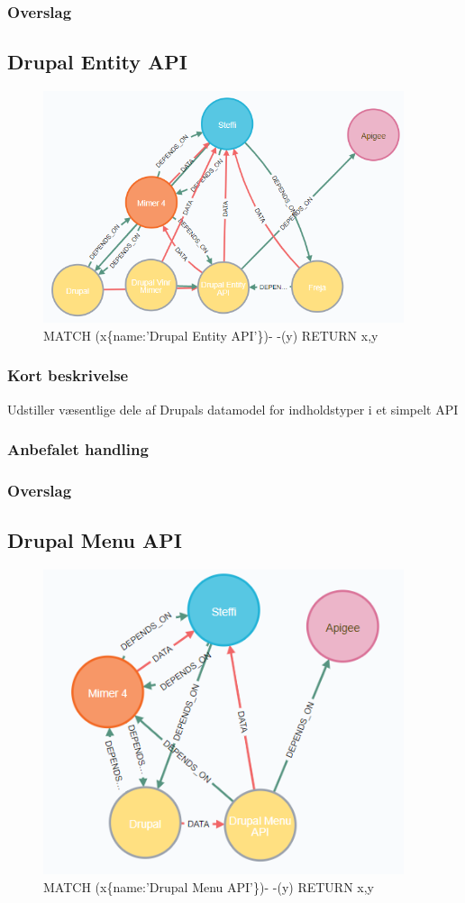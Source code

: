 \documentclass{article}
\begin{document}
\subsubsection{Overslag}


\subsection{Drupal Entity API}
\begin{figure}[h]
\includegraphics[width=300pt]{DrupalEntityAPI.PNG}
\caption{MATCH (x\{name:'Drupal Entity API'\})- -(y) RETURN x,y}
\end{figure}
\subsubsection{Kort beskrivelse}
Udstiller væsentlige dele af Drupals datamodel for indholdstyper i et simpelt API
\subsubsection{Anbefalet handling}
\subsubsection{Overslag}
\newpage{}
\clearpage


\subsection{Drupal Menu API}
\begin{figure}[h]
\includegraphics[width=300pt]{DrupalMenuAPI.PNG}
\caption{MATCH (x\{name:'Drupal Menu API'\})- -(y) RETURN x,y}
\end{figure}
\end{document}
